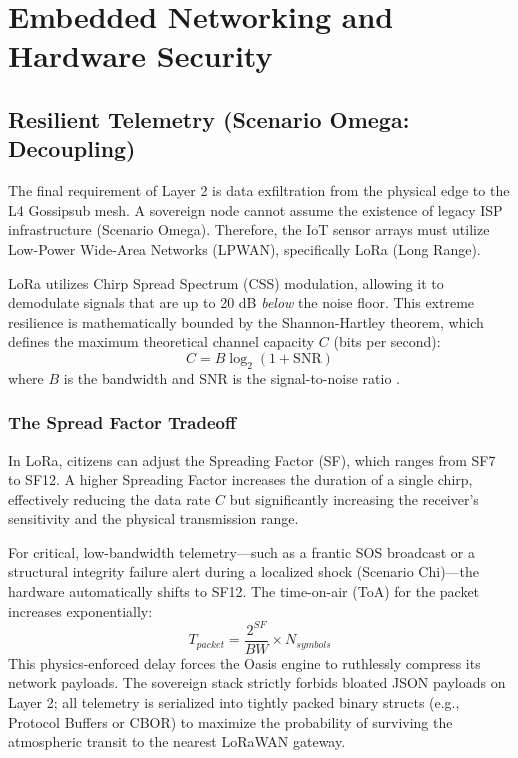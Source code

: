 \chapter{Embedded Networking and Hardware Security}

\section{Resilient Telemetry (Scenario Omega: Decoupling)}
The final requirement of Layer 2 is data exfiltration from the physical edge to the L4 Gossipsub mesh. A sovereign node cannot assume the existence of legacy ISP infrastructure (Scenario Omega). Therefore, the IoT sensor arrays must utilize Low-Power Wide-Area Networks (LPWAN), specifically LoRa (Long Range).

LoRa utilizes Chirp Spread Spectrum (CSS) modulation, allowing it to demodulate signals that are up to 20 dB \textit{below} the noise floor. This extreme resilience is mathematically bounded by the Shannon-Hartley theorem, which defines the maximum theoretical channel capacity $C$ (bits per second):
\begin{equation}
C = B \log_2(1 + \text{SNR})
\end{equation}
where $B$ is the bandwidth and SNR is the signal-to-noise ratio \cite{shannon1949communication}.

\subsection{The Spread Factor Tradeoff}
In LoRa, citizens can adjust the Spreading Factor (SF), which ranges from SF7 to SF12. A higher Spreading Factor increases the duration of a single chirp, effectively reducing the data rate $C$ but significantly increasing the receiver's sensitivity and the physical transmission range. 

For critical, low-bandwidth telemetry—such as a frantic SOS broadcast or a structural integrity failure alert during a localized shock (Scenario Chi)—the hardware automatically shifts to SF12. The time-on-air (ToA) for the packet increases exponentially:
\begin{equation}
T_{packet} = \frac{2^{SF}}{BW} \times N_{symbols}
\end{equation}
This physics-enforced delay forces the Oasis engine to ruthlessly compress its network payloads. The sovereign stack strictly forbids bloated JSON payloads on Layer 2; all telemetry is serialized into tightly packed binary structs (e.g., Protocol Buffers or CBOR) to maximize the probability of surviving the atmospheric transit to the nearest LoRaWAN gateway.

